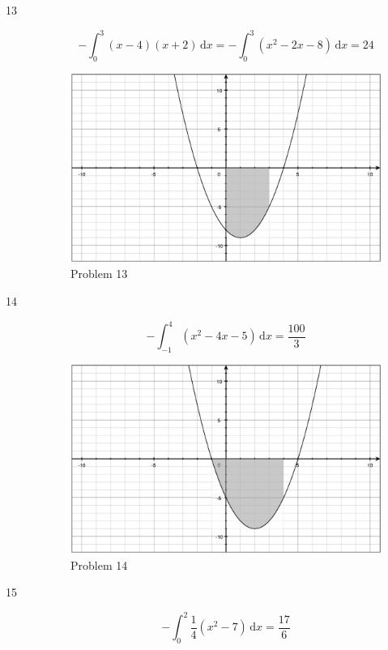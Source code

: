 \documentclass{exam}
\begin{document}
\begin{description}
\item[13]
\[
  - \int_0^3 (x - 4)(x + 2) \, \mathrm{d}x = - \int_0^3 (x^2 - 2x - 8) \, \mathrm{d}x = 24
\] 

\begin{figure}[H]
  \centering
  \includegraphics[scale=.3]{problem_13.eps}
  \caption*{Problem 13}
\end{figure}

\item[14]
\[
  - \int_{-1}^4 (x^2 - 4x - 5) \, \mathrm{d}x = \frac{100}{3}
\] 

\begin{figure}[H]
  \centering
  \includegraphics[scale=.3]{problem_14.eps}
  \caption*{Problem 14}
\end{figure}

\item[15]
\[
  - \int_0^2 \frac{1}{4} (x^2 - 7) \, \mathrm{d}x = \frac{17}{6}
\] 


\end{description}
\end{document}
